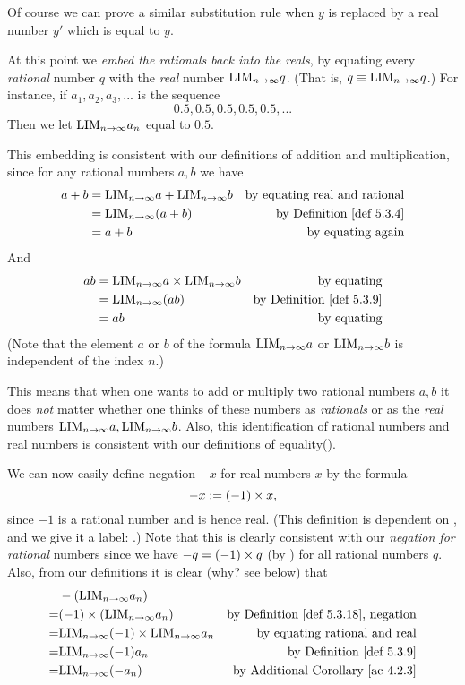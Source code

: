Of course we can prove a similar substitution rule when \(y\) is replaced by a real number \(y'\) which is equal to \(y\).

\begin{note}
At this point we \emph{embed the rationals back into the reals}, by equating every \emph{rational} number \(q\) with the \emph{real} number \(\text{LIM}_{n \to \infty} q\).
(That is, \(q \equiv \text{LIM}_{n \to \infty} q\).)
For instance, if \(a_1, a_2, a_3, ...\) is the sequence
\[
	0.5, 0.5, 0.5, 0.5, 0.5,...
\]
Then we let \(\text{LIM}_{n \to \infty} a_n\) equal to \(0.5\).

This embedding is consistent with our definitions of addition and multiplication, since for any rational numbers \(a, b\) we have
\begin{align*}
	a + b & = \LIM_{n \toINF} a + \LIM_{n \toINF} b & \text{by equating real and rational} \\
          & = \LIM_{n \toINF}(a + b) & \text{by \DEF{5.3.4}} \\
          & = a + b & \text{by equating again}
\end{align*}
And
\begin{align*}
	ab & = \LIM_{n \toINF} a \X \LIM_{n \toINF} b & \text{by equating} \\
          & = \LIM_{n \toINF}(ab) & \text{by \DEF{5.3.9}} \\
          & = ab & \text{by equating}
\end{align*}
(Note that the element \(a\) or \(b\) of the formula \(\text{LIM}_{n \to \infty} a\) or \(\text{LIM}_{n \to \infty} b\) is independent of the index \(n\).)

This means that when one wants to add or multiply two rational numbers \(a, b\) it does \emph{not} matter whether one thinks of these numbers as \emph{rationals} or as the \emph{real} numbers \(\text{LIM}_{n \to \infty} a, \text{LIM}_{n \to \infty} b\).
Also, this identification of rational numbers and real numbers is consistent with our definitions of equality().
\end{note}

We can now easily define negation \(-x\) for real numbers \(x\) by the formula
\[
    -x := (-1) \times x,
\]
since \(-1\) is a rational number and is hence real.
(This definition is dependent on , and we give it a label: .)
Note that this is clearly consistent with our \emph{negation for rational} numbers since we have \(-q = (-1) \times q\) (by ) for all rational numbers \(q\).
Also, from our definitions it is clear (why? see below) that
\begin{align*}
      & -(\LIM_{n \toINF} a_n) \\
    = & (-1) \X (\LIM_{n \toINF} a_n) & \text{by \DEF{5.3.18}, negation} \\
    = & \LIM_{n \toINF} (-1) \X \LIM_{n \toINF} a_n & \text{by equating rational and real} \\
    = & \LIM_{n \toINF} (-1) a_n & \text{by \DEF{5.3.9}} \\
    = & \LIM_{n \toINF} (-a_n)  & \text{by \AC{4.2.3}}
\end{align*}

